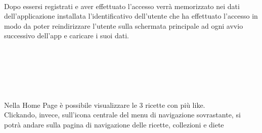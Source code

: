 ﻿\documentclass[a4paper,12pt]{report}
\begin{document}
\\Dopo essersi registrati e aver effettuato l'accesso verrà memorizzato nei dati dell'applicazione installata l'identificativo dell'utente che ha effettuato l'accesso in modo da poter reindirizzare l'utente sulla schermata principale ad ogni avvio successivo dell'app e caricare i suoi dati.
\\\\\\\\\\\\\\Nella Home Page è possibile visualizzare le 3 ricette con più like.
\\Clickando, invece, sull'icona centrale del menu di navigazione sovrastante, si potrà andare sulla pagina di navigazione delle ricette, collezioni e diete
\end{document}
